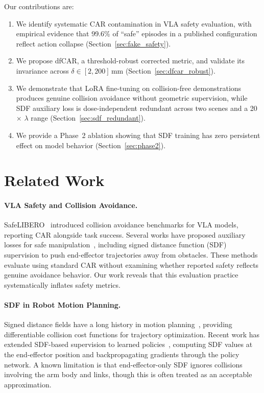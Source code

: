 \documentclass[10pt,letterpaper]{article}
\begin{document}
Our contributions are:
\begin{enumerate}
    \item We identify systematic CAR contamination in VLA safety evaluation, with empirical evidence that 99.6\% of ``safe'' episodes in a published configuration reflect action collapse (Section~\ref{sec:fake_safety}).
    \item We propose dfCAR, a threshold-robust corrected metric, and validate its invariance across $\delta \in [2, 200]$\,mm (Section~\ref{sec:dfcar_robust}).
    \item We demonstrate that LoRA fine-tuning on collision-free demonstrations produces genuine collision avoidance without geometric supervision, while SDF auxiliary loss is dose-independent redundant across two scenes and a 20$\times$ $\lambda$ range (Section~\ref{sec:sdf_redundant}).
    \item We provide a Phase~2 ablation showing that SDF training has zero persistent effect on model behavior (Section~\ref{sec:phase2}).
\end{enumerate}

\section{Related Work}
\label{sec:related}

\paragraph{VLA Safety and Collision Avoidance.}
SafeLIBERO~\cite{safelibero2025} introduced collision avoidance benchmarks for VLA models, reporting CAR alongside task success. Several works have proposed auxiliary losses for safe manipulation~\cite{sdf_safety2024,safe_diffusion2025}, including signed distance function (SDF) supervision to push end-effector trajectories away from obstacles. These methods evaluate using standard CAR without examining whether reported safety reflects genuine avoidance behavior. Our work reveals that this evaluation practice systematically inflates safety metrics.

\paragraph{SDF in Robot Motion Planning.}
Signed distance fields have a long history in motion planning~\cite{ratliff2009chomp,zucker2013chomp,schulman2014trajopt}, providing differentiable collision cost functions for trajectory optimization. Recent work has extended SDF-based supervision to learned policies~\cite{neural_sdf2023,diff_sdf2024}, computing SDF values at the end-effector position and backpropagating gradients through the policy network. A known limitation is that end-effector-only SDF ignores collisions involving the arm body and links, though this is often treated as an acceptable approximation.
\end{document}
